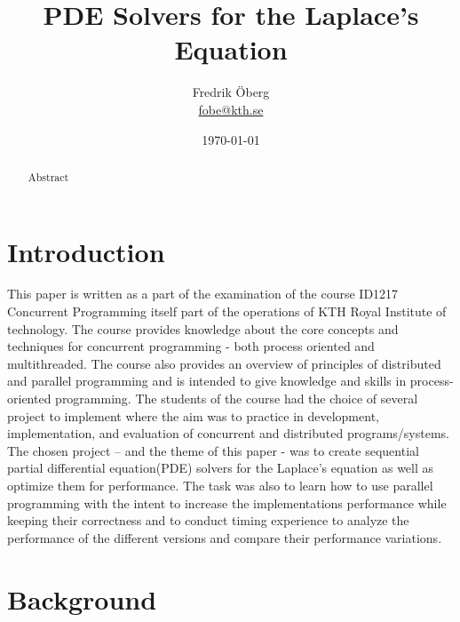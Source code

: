 \documentclass{article}
\begin{document}
\title{PDE Solvers for the Laplace's Equation}
\author{Fredrik Öberg \\ \href{mailto:fobe@kth.se}{fobe@kth.se}}
\date{\today}
\maketitle

\begin{abstract}
Abstract
\end{abstract}

\newpage
\tableofcontents
\newpage

\section{Introduction}
This paper is written as a part of the examination of the course ID1217 Concurrent Programming itself part of the operations of KTH Royal Institute of technology. The course provides knowledge about the core concepts and techniques for concurrent programming - both process oriented and multithreaded. The course also provides an overview of principles of distributed and parallel programming and is intended to give knowledge and skills in process-oriented programming. 
The students of the course had the choice of several project to implement where the aim was to practice in development, implementation, and evaluation of concurrent and distributed programs/systems. The chosen project – and the theme of this paper - was to create sequential partial differential equation(PDE) solvers for the Laplace’s equation as well as optimize them for performance. The task was also to learn how to use parallel programming with the intent to increase the implementations performance while keeping their correctness and to conduct timing experience to analyze the performance of the different versions and compare their performance variations.

\section{Background}\label{programs}
\end{document}
